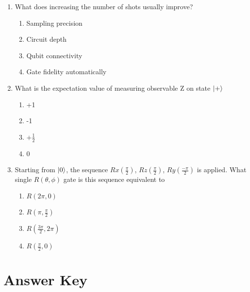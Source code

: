 \documentclass[11pt,a4paper]{article}
\begin{document}
\begin{enumerate}
\begin{lstlisting}[language=Python]
\end{lstlisting}

\begin{enumerate}[label=\Alph*.]
\item counts = result[0].data.meas.get\_counts()
\item counts = result[0].data.clbits.get\_counts()
\item counts = result[0].data.evs.get\_counts()
\item counts = result[0].data.stds.get\_counts()
\end{enumerate}

\item What does increasing the number of shots usually improve?

\begin{enumerate}[label=\Alph*.]
\item Sampling precision
\item Circuit depth
\item Qubit connectivity
\item Gate fidelity automatically
\end{enumerate}

\item What is the expectation value of measuring observable Z on state $\ket{+}$

\begin{enumerate}[label=\Alph*.]
\item +1
\item -1
\item $+\frac{1}{2}$
\item 0
\end{enumerate}

\item Starting from $\ket{0}$, the sequence $Rx(\frac{\pi}{2})$, $Rz(\frac{\pi}{2})$, $Ry(\frac{-\pi}{2})$ is applied. What single $R(\theta,\phi)$ gate is this sequence equivalent to

\begin{enumerate}[label=\Alph*.]
\item $R(2\pi,0)$
\item $R(\pi,\frac{\pi}{2})$
\item $R(\frac{3\pi}{2},2\pi)$
\item $R(\frac{\pi}{2},0)$
\end{enumerate}


\end{enumerate}

\newpage

\section*{Answer Key}
\end{document}

